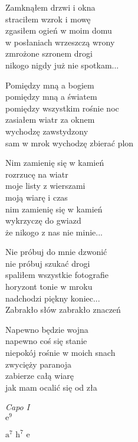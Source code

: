 \begin{text}
    \chordfill
    Zamknąłem drzwi i okna\\
    straciłem wzrok i mowę\\
    zgasiłem ogień w moim domu\\
    w posłaniach wrzeszczą wrony\\
    zmrożone szronem drogi\\
    nikogo nigdy już nie spotkam...

    Pomiędzy mną a bogiem\\
    pomiędzy mną a światem\\
    pomiędzy wszystkim rośnie noc\\
    zasiałem wiatr za oknem\\
    wychodzę zawstydzony\\
    sam w mrok wychodzę zbierać plon

    \vin Nim zamienię się w kamień\\
    \vin rozrzucę na wiatr\\
    \vin moje listy z wierszami\\
    \vin moją wiarę i czas\\
    \vin nim zamienię się w kamień\\
    \vin wykrzyczę do gwiazd\\
    \vin że nikogo z nas nie minie...

    Nie próbuj do mnie dzwonić\\
    nie próbuj szukać drogi\\
    spaliłem wszystkie fotografie\\
    horyzont tonie w mroku\\
    nadchodzi piękny koniec...\\
    Zabrakło słów zabrakło znaczeń

    Napewno będzie wojna\\
    napewno coś się stanie\\
    niepokój rośnie w moich snach\\
    zwycięży paranoja\\
    zabierze całą wiarę\\
    jak mam ocalić się od zła
\end{text}
\begin{chord}
    \textit{Capo I}\\
    $\mathrm{e^{9}}$

    $\mathrm{a^{7}}$ $\mathrm{h^{7}}$ e
\end{chord}
